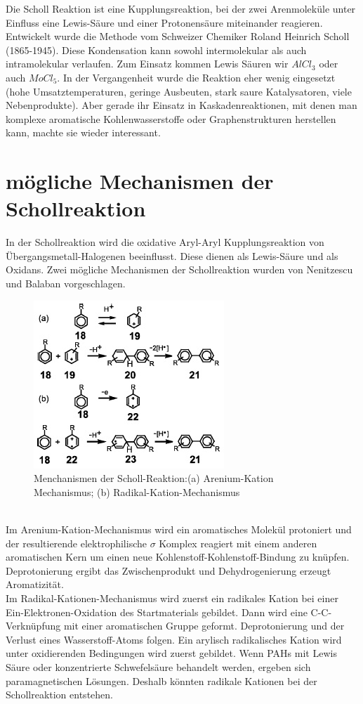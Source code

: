 Die Scholl Reaktion ist eine Kupplungsreaktion, bei der zwei Arenmoleküle unter Einfluss eine Lewis-Säure und einer Protonensäure miteinander reagieren. Entwickelt wurde die Methode vom Schweizer Chemiker Roland Heinrich Scholl (1865-1945).
Diese Kondensation kann sowohl intermolekular als auch intramolekular verlaufen. Zum Einsatz kommen Lewis Säuren wir $AlCl_3$ oder auch $MoCl_5$. In der Vergangenheit wurde die Reaktion eher wenig eingesetzt (hohe Umsatztemperaturen, geringe Ausbeuten, stark saure Katalysatoren, viele Nebenprodukte). Aber gerade ihr Einsatz in Kaskadenreaktionen, mit denen man komplexe aromatische Kohlenwasserstoffe oder Graphenstrukturen herstellen kann, machte sie wieder interessant. \cite{[12]}
\section{mögliche Mechanismen der Schollreaktion}
In der Schollreaktion wird die oxidative Aryl-Aryl Kupplungsreaktion von Übergangsmetall-Halogenen beeinflusst. Diese dienen als Lewis-Säure und als Oxidans. Zwei mögliche Mechanismen der Schollreaktion wurden von Nenitzescu und Balaban vorgeschlagen. %
\begin{figure}[!htpb]
\centering
\includegraphics[scale=1]{graphics/Schollreactionmechanismen}
\caption{Menchanismen der Scholl-Reaktion:(a) Arenium-Kation Mechanismus; (b) Radikal-Kation-Mechanismus}
\end{figure}
\\Im Arenium-Kation-Mechanismus wird ein aromatisches Molekül protoniert und der resultierende elektrophilische $\sigma$ Komplex reagiert mit einem anderen aromatischen Kern um einen neue Kohlenstoff-Kohlenstoff-Bindung zu knüpfen. Deprotonierung ergibt das Zwischenprodukt und Dehydrogenierung erzeugt Aromatizität.
\\Im Radikal-Kationen-Mechanismus wird zuerst ein radikales Kation bei einer Ein-Elektronen-Oxidation des Startmaterials gebildet. Dann wird eine C-C-Verknüpfung mit einer aromatischen Gruppe geformt. Deprotonierung und der Verlust eines Wasserstoff-Atoms folgen. Ein arylisch radikalisches Kation wird unter oxidierenden Bedingungen wird zuerst gebildet. Wenn PAHs mit Lewis Säure oder konzentrierte Schwefelsäure behandelt werden, ergeben sich paramagnetischen Lösungen. Deshalb könnten radikale Kationen bei der Schollreaktion entstehen.\cite{[13]}
